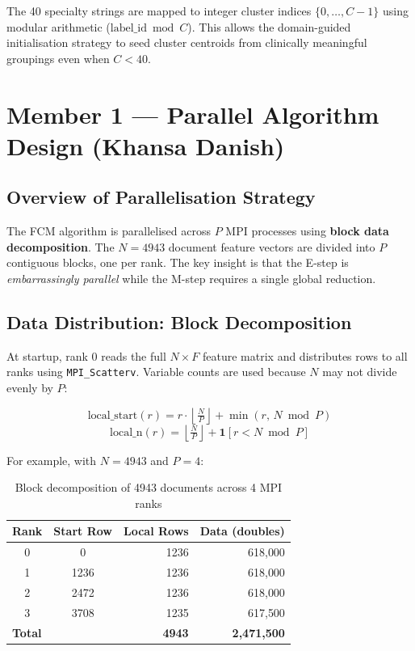 \documentclass[12pt,a4paper]{article}
\begin{document}
The 40 specialty strings are mapped to integer cluster indices $\{0, \ldots, C-1\}$ using modular arithmetic ($\text{label\_id} \bmod C$). This allows the domain-guided initialisation strategy to seed cluster centroids from clinically meaningful groupings even when $C < 40$.

\section{Member 1 --- Parallel Algorithm Design (Khansa Danish)}

\subsection{Overview of Parallelisation Strategy}

The FCM algorithm is parallelised across $P$ MPI processes using \textbf{block data decomposition}. The $N = 4943$ document feature vectors are divided into $P$ contiguous blocks, one per rank. The key insight is that the E-step is \emph{embarrassingly parallel} while the M-step requires a single global reduction.

\subsection{Data Distribution: Block Decomposition}

At startup, rank 0 reads the full $N \times F$ feature matrix and distributes rows to all ranks using \texttt{MPI\_Scatterv}. Variable counts are used because $N$ may not divide evenly by $P$:

\[
\text{local\_start}(r) = r \cdot \left\lfloor \tfrac{N}{P} \right\rfloor + \min(r,\, N \bmod P)
\]
\[
\text{local\_n}(r) = \left\lfloor \tfrac{N}{P} \right\rfloor + \mathbf{1}[r < N \bmod P]
\]

For example, with $N = 4943$ and $P = 4$:

\begin{table}[H]
\centering
\begin{tabular}{ccrr}
\toprule
\textbf{Rank} & \textbf{Start Row} & \textbf{Local Rows} & \textbf{Data (doubles)} \\
\midrule
0 & 0    & 1236 & 618{,}000 \\
1 & 1236 & 1236 & 618{,}000 \\
2 & 2472 & 1236 & 618{,}000 \\
3 & 3708 & 1235 & 617{,}500 \\
\midrule
\multicolumn{2}{l}{\textbf{Total}} & \textbf{4943} & \textbf{2,471,500} \\
\bottomrule
\end{tabular}
\caption{Block decomposition of 4943 documents across 4 MPI ranks}
\end{table}
\end{document}
